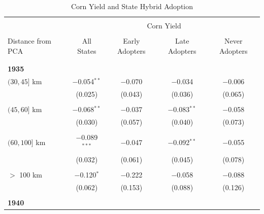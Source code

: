 \documentclass[12pt]{article}
\begin{document}
\begin{appendices}
\begin{table}[!htbp] \centering 
    \caption{Corn Yield and State Hybrid Adoption} 
    \label{hybrid_table} 
    \begin{threeparttable}[t]
\footnotesize
\begin{tabular}{@{\extracolsep{5pt}}lcccc} 
\\[-1.8ex]\hline 
\hline\\[-1.8ex] & \multicolumn{4}{c}{Corn Yield}  \\
\cline{2-5} 
\\ Distance from PCA & All States & Early Adopters & Late Adopters & Never Adopters \\ 
\hline \\[-1.8ex] 
\\\multicolumn{1}{l}{\textbf{1935}} & & & & \\ 
$(30, 45]$ km    & $-$0.054$^{**}$     & $-$0.070      & $-$0.034         & $-$0.006 \\
                 & (0.025)             & (0.043)       & (0.036)          & (0.065) \\
                 &                     &               &                  & \\
$(45, 60]$ km    & $-$0.068$^{**}$     & $-$0.037      & $-$0.083$^{**}$  & $-$0.058 \\
                 & (0.030)             & (0.057)       & (0.040)          & (0.073) \\
                 &                     &               &                  & \\
$(60, 100]$ km   & $-$0.089$^{***}$    & $-$0.047      & $-$0.092$^{**}$  & $-$0.055 \\
                 & (0.032)             & (0.061)       & (0.045)          & (0.078) \\
                 &                     &               &                  & \\
$>$ 100 km       & $-$0.120$^{*}$      & $-$0.222      & $-$0.058         & $-$0.088 \\
                 & (0.062)             & (0.153)       & (0.088)          & (0.126) \\
\\\multicolumn{1}{l}{\textbf{1940}} & & & & \\ 



\end{tabular}
\end{threeparttable}
\end{table}
\end{appendices}
\end{document}
